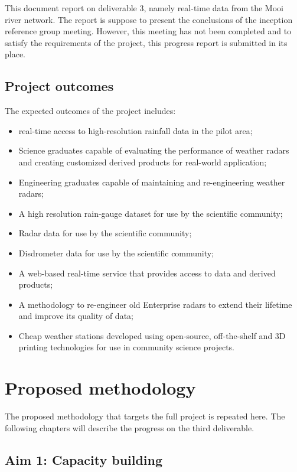 \documentclass{wrcreport}
\begin{document}
This document report on deliverable 3, namely real-time data from the
Mooi river network. The report is suppose to present the conclusions
of the inception reference group meeting. However, this meeting has
not been completed and to satisfy the requirements of the project,
this progress report is submitted in its place.

\section{Project outcomes}

The expected outcomes of the project includes:
\begin{itemize}
\item real-time access to high-resolution rainfall data in the pilot area;
\item Science graduates capable of evaluating the performance of weather radars and creating customized derived products for real-world application;
\item Engineering graduates capable of maintaining and re-engineering weather radars;
\item A high resolution rain-gauge dataset for use by the scientific community;
\item Radar data for use by the scientific community;
\item Disdrometer data for use by the scientific community;
\item A web-based real-time service that provides access to data and derived products;
\item A methodology to re-engineer old Enterprise radars to extend their lifetime and improve its quality of data;
\item Cheap weather stations developed using open-source, off-the-shelf and 3D printing technologies for use in community science projects.
\end{itemize}

\chapter{Proposed methodology}
\label{chap:meth}

The proposed methodology that targets the full project is repeated
here. The following chapters will describe the progress on the third
deliverable.

\section{Aim 1: Capacity building}
\end{document}
